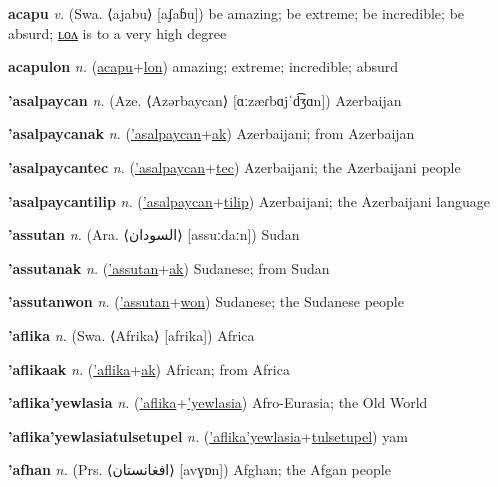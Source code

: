 \textbf{\hypertarget{acapu}{acapu}} \textit{v.} (Swa. ⟨ajabu⟩ [aʄaɓu])
be amazing; be extreme; be incredible; be absurd; \hyperlink{acapulon}{ʟᴏᴧ} is to a very high degree

\textbf{\hypertarget{acapulon}{acapulon}} \textit{n.} (\hyperlink{acapu}{acapu}+\allowbreak \hyperlink{lon}{lon})
amazing; extreme; incredible; absurd

\textbf{\hypertarget{'asalpaycan}{'asalpaycan}} \textit{n.} (Aze. ⟨Azərbaycan⟩ [ɑːzæɾbɑjˈd͡ʒɑn])
Azerbaijan

\textbf{\hypertarget{'asalpaycanak}{'asalpaycanak}} \textit{n.} (\hyperlink{'asalpaycan}{'asalpaycan}+\allowbreak \hyperlink{ak}{ak})
Azerbaijani; from Azerbaijan

\textbf{\hypertarget{'asalpaycantec}{'asalpaycantec}} \textit{n.} (\hyperlink{'asalpaycan}{'asalpaycan}+\allowbreak \hyperlink{tec}{tec})
Azerbaijani; the Azerbaijani people

\textbf{\hypertarget{'asalpaycantilip}{'asalpaycantilip}} \textit{n.} (\hyperlink{'asalpaycan}{'asalpaycan}+\allowbreak \hyperlink{tilip}{tilip})
Azerbaijani; the Azerbaijani language

\textbf{\hypertarget{'assutan}{'assutan}} \textit{n.} (Ara. ⟨{\arabics{}السودان‎}⟩ [assuːdaːn])
Sudan

\textbf{\hypertarget{'assutanak}{'assutanak}} \textit{n.} (\hyperlink{'assutan}{'assutan}+\allowbreak \hyperlink{ak}{ak})
Sudanese; from Sudan

\textbf{\hypertarget{'assutanwon}{'assutanwon}} \textit{n.} (\hyperlink{'assutan}{'assutan}+\allowbreak \hyperlink{won}{won})
Sudanese; the Sudanese people

\textbf{\hypertarget{'aflika}{'aflika}} \textit{n.} (Swa. ⟨Afrika⟩ [afrika])
Africa

\textbf{\hypertarget{'aflikaak}{'aflikaak}} \textit{n.} (\hyperlink{'aflika}{'aflika}+\allowbreak \hyperlink{ak}{ak})
African; from Africa

\textbf{\hypertarget{'aflika'yewlasia}{'aflika'yewlasia}} \textit{n.} (\hyperlink{'aflika}{'aflika}+\allowbreak \hyperlink{'yewlasia}{'yewlasia})
Afro-Eurasia; the Old World

\textbf{\hypertarget{'aflika'yewlasiatulsetupel}{'aflika'yewlasiatulsetupel}} \textit{n.} (\hyperlink{'aflika'yewlasia}{'aflika'yewlasia}+\allowbreak \hyperlink{tulsetupel}{tulsetupel})
yam

\textbf{\hypertarget{'afhan}{'afhan}} \textit{n.} (Prs. ⟨{\arabics{}افغانستان‬}⟩ [avɣɒn])
Afghan; the Afgan people

